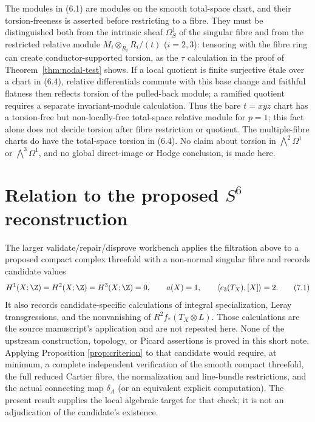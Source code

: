 \begin{remark}
\label{rem:relative-local-scope}
The modules in (6.1) are modules on the smooth total-space chart, and their
torsion-freeness is asserted before restricting to a fibre.  They must be
distinguished both from the intrinsic sheaf $\Omega^1_S$ of the singular
fibre and from the restricted relative module
$M_i\otimes_{R_i}R_i/(t)$ ($i=2,3$): tensoring with the fibre ring can create
conductor-supported torsion, as the $\tau$ calculation in the proof of
Theorem~\ref{thm:nodal-test} shows.  If a local quotient is finite
surjective \'{e}tale over a chart in (6.4), relative differentials commute with
this base change and faithful flatness then reflects torsion of the pulled-back
module; a ramified quotient
requires a separate invariant-module calculation.  Thus the bare $t=xyz$
chart has a torsion-free but non-locally-free total-space relative module for
$p=1$; this fact alone does not decide torsion after fibre restriction or
quotient.  The multiple-fibre charts do have the total-space torsion in
(6.4).  No claim about torsion in $\bigwedge^2\Omega^1$ or
$\bigwedge^3\Omega^1$, and no global direct-image or Hodge conclusion, is
made here.
\end{remark}

\section{\texorpdfstring{Relation to the proposed $S^6$ reconstruction}{Relation to the proposed S6 reconstruction}}

The larger validate/repair/disprove workbench applies the filtration above to
a proposed compact complex threefold with a non-normal singular fibre and
records candidate values
\[
 H^1(X;\Z)=H^2(X;\Z)=H^3(X;\Z)=0,
 \qquad a(X)=1,
 \qquad \langle c_3(T_X),[X]\rangle=2.
 \tag{7.1}
\]
It also records candidate-specific calculations of integral specialization,
Leray transgressions, and the nonvanishing of
$R^2f_*(T_X\otimes L)$.  Those calculations are the source manuscript's
application and are not repeated here.  None of the upstream construction,
topology, or Picard assertions is proved in this short note.  Applying Proposition
\ref{prop:criterion} to that candidate would require, at minimum, a complete
independent verification of the smooth compact threefold, the full reduced
Cartier fibre, the normalization and line-bundle restrictions, and the
actual connecting map $\delta_A$ (or an equivalent explicit computation).
The present result supplies the local algebraic target for that check; it is
not an adjudication of the candidate's existence.


